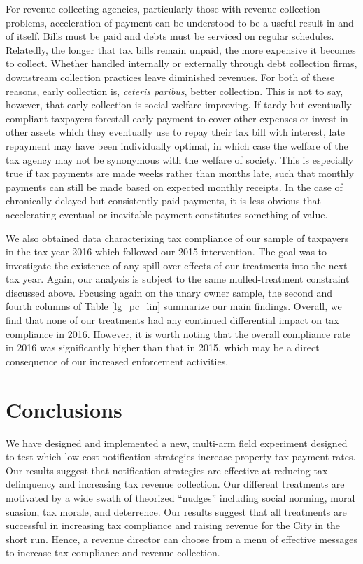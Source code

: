 \documentclass[12pt]{article}
\begin{document}
For revenue collecting agencies, particularly those with revenue
collection problems, acceleration of payment can be understood to be a
useful result in and of itself. Bills must be paid and debts must be
serviced on regular schedules. Relatedly, the longer that tax bills
remain unpaid, the more expensive it becomes to collect. Whether
handled internally or externally through debt collection firms,
downstream collection practices leave diminished revenues. For both of
these reasons, early collection is, \textit{ceteris paribus}, better
collection. This is not to say, however, that early collection is
social-welfare-improving. If tardy-but-eventually-compliant taxpayers
forestall early payment to cover other expenses or invest
in other assets which they eventually use to repay their tax bill with
interest, late repayment may have been individually optimal, 
in which case the welfare of the tax agency may not be synonymous
with the welfare of society. This is especially true if tax payments
are made weeks rather than months late, such that monthly payments can
still be made based on expected monthly receipts.  In the case
of chronically-delayed but consistently-paid payments, it is less
obvious that accelerating eventual or inevitable payment constitutes
something of value.

We also obtained data characterizing tax compliance of our sample of
taxpayers in the tax year 2016 which followed our 2015 intervention.
The goal was to investigate the existence of any spill-over effects of
our treatments into the next tax year. Again, our analysis is subject
to the same mulled-treatment constraint discussed above.  Focusing
again on the unary owner sample, the second and fourth columns of
Table \ref{lg_pc_lin} summarize our main findings. Overall, we find
that none of our treatments had any continued differential impact on
tax compliance in 2016. However, it is worth noting that the overall
compliance rate in 2016 was significantly higher than that in 2015,
which may be a direct consequence of our increased enforcement
activities.
 

\section{Conclusions}


We have designed and implemented a new, multi-arm field experiment
designed to test which low-cost notification strategies increase
property tax payment rates. Our results suggest that notification
strategies are effective at reducing tax delinquency and increasing
tax revenue collection.  Our different treatments are motivated by a
wide swath of theorized ``nudges'' including social norming, moral
suasion, tax morale, and deterrence. Our results suggest that all
treatments are successful in increasing tax compliance and raising
revenue for the City in the short run. Hence, a revenue director can
choose from a menu of effective messages to increase tax compliance and
revenue collection.
\end{document}
